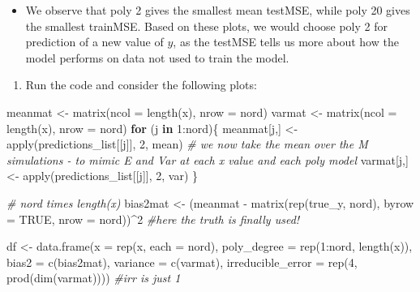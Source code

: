 \documentclass[
]{article}
\newenvironment{Shaded}{\begin{snugshade}}{\end{snugshade}}
\newcommand{\AttributeTok}[1]{\textcolor[rgb]{0.77,0.63,0.00}{#1}}
\newcommand{\CommentTok}[1]{\textcolor[rgb]{0.56,0.35,0.01}{\textit{#1}}}
\newcommand{\ConstantTok}[1]{\textcolor[rgb]{0.00,0.00,0.00}{#1}}
\newcommand{\ControlFlowTok}[1]{\textcolor[rgb]{0.13,0.29,0.53}{\textbf{#1}}}
\newcommand{\DecValTok}[1]{\textcolor[rgb]{0.00,0.00,0.81}{#1}}
\newcommand{\FunctionTok}[1]{\textcolor[rgb]{0.00,0.00,0.00}{#1}}
\newcommand{\NormalTok}[1]{#1}
\newcommand{\OtherTok}[1]{\textcolor[rgb]{0.56,0.35,0.01}{#1}}
\newcommand{\SpecialCharTok}[1]{\textcolor[rgb]{0.00,0.00,0.00}{#1}}
\providecommand{\tightlist}{%
  \setlength{\itemsep}{0pt}\setlength{\parskip}{0pt}}
\begin{document}
\begin{itemize}
\tightlist
\item
  We observe that poly 2 gives the smallest mean testMSE, while poly 20
  gives the smallest trainMSE. Based on these plots, we would choose
  poly 2 for prediction of a new value of \(y\), as the testMSE tells us
  more about how the model performs on data not used to train the model.
\end{itemize}

\begin{enumerate}
\def\labelenumi{\alph{enumi})}
\setcounter{enumi}{2}
\tightlist
\item
  Run the code and consider the following plots:
\end{enumerate}

\begin{Shaded}
\begin{Highlighting}[]
\NormalTok{meanmat }\OtherTok{\textless{}{-}} \FunctionTok{matrix}\NormalTok{(}\AttributeTok{ncol =} \FunctionTok{length}\NormalTok{(x), }\AttributeTok{nrow =}\NormalTok{ nord)}
\NormalTok{varmat }\OtherTok{\textless{}{-}} \FunctionTok{matrix}\NormalTok{(}\AttributeTok{ncol =} \FunctionTok{length}\NormalTok{(x), }\AttributeTok{nrow =}\NormalTok{ nord)}
\ControlFlowTok{for}\NormalTok{ (j }\ControlFlowTok{in} \DecValTok{1}\SpecialCharTok{:}\NormalTok{nord)\{}
\NormalTok{  meanmat[j,] }\OtherTok{\textless{}{-}} \FunctionTok{apply}\NormalTok{(predictions\_list[[j]], }\DecValTok{2}\NormalTok{, mean) }\CommentTok{\# we now take the mean over the M simulations {-} to mimic E and Var at each x value and each poly model}
\NormalTok{  varmat[j,] }\OtherTok{\textless{}{-}} \FunctionTok{apply}\NormalTok{(predictions\_list[[j]], }\DecValTok{2}\NormalTok{, var)}
\NormalTok{\}}

\CommentTok{\# nord times length(x)}
\NormalTok{bias2mat }\OtherTok{\textless{}{-}}\NormalTok{ (meanmat }\SpecialCharTok{{-}} \FunctionTok{matrix}\NormalTok{(}\FunctionTok{rep}\NormalTok{(true\_y, nord), }\AttributeTok{byrow =} \ConstantTok{TRUE}\NormalTok{, }\AttributeTok{nrow =}\NormalTok{ nord))}\SpecialCharTok{\^{}}\DecValTok{2} \CommentTok{\#here the truth is finally used!}

\NormalTok{df }\OtherTok{\textless{}{-}} \FunctionTok{data.frame}\NormalTok{(}\AttributeTok{x =} \FunctionTok{rep}\NormalTok{(x, }\AttributeTok{each =}\NormalTok{ nord), }\AttributeTok{poly\_degree =} \FunctionTok{rep}\NormalTok{(}\DecValTok{1}\SpecialCharTok{:}\NormalTok{nord, }\FunctionTok{length}\NormalTok{(x)), }
                 \AttributeTok{bias2 =} \FunctionTok{c}\NormalTok{(bias2mat), }\AttributeTok{variance =} \FunctionTok{c}\NormalTok{(varmat), }
                 \AttributeTok{irreducible\_error =} \FunctionTok{rep}\NormalTok{(}\DecValTok{4}\NormalTok{, }\FunctionTok{prod}\NormalTok{(}\FunctionTok{dim}\NormalTok{(varmat)))) }\CommentTok{\#irr is just 1}


\end{Highlighting}
\end{Shaded}
\end{document}
